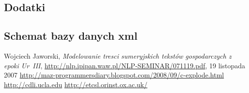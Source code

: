 \documentclass{pracamgr}
\begin{document}
\begin{appendix}
\part*{Dodatki}

\chapter{Schemat bazy danych xml}
\label{appendix:xmlsch}





\end{appendix}

\begin{thebibliography}{99}
 Wojciech Jaworski, \textit{Modelowanie tresci sumeryjskich tekstów gospodarczych z epoki Ur~III}, 
\url{http://nlp.ipipan.waw.pl/NLP-SEMINAR/071119.pdf}, 19 listopada 2007
 \url{http://maz-programmersdiary.blogspot.com/2008/09/c-explode.html}
 \url{http://cdli.ucla.edu}
 \url{http://etcsl.orinst.ox.ac.uk/}




\end{thebibliography}

\listoffigures
\end{document}
